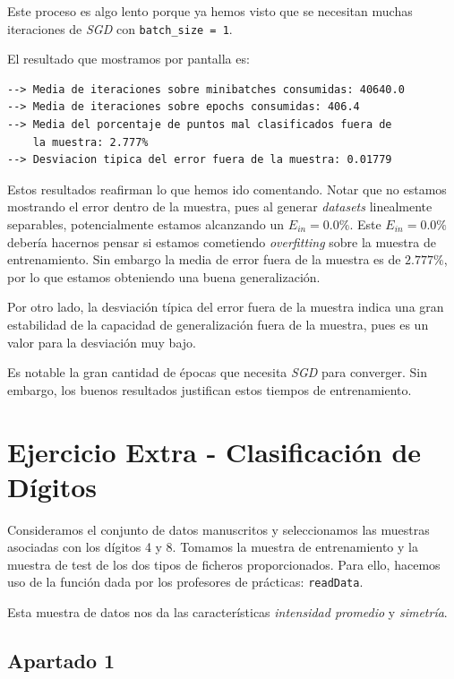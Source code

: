 \documentclass[11pt]{article}
\begin{document}
Este proceso es algo lento porque ya hemos visto que se necesitan muchas iteraciones de \emph{SGD} con \lstinline{batch_size = 1}.

El resultado que mostramos por pantalla es:

\begin{lstlisting}[caption={Resultado de las 100 iteraciones del experimento}, captionpos=b]
--> Media de iteraciones sobre minibatches consumidas: 40640.0
--> Media de iteraciones sobre epochs consumidas: 406.4
--> Media del porcentaje de puntos mal clasificados fuera de
    la muestra: 2.777%
--> Desviacion tipica del error fuera de la muestra: 0.01779
\end{lstlisting}

Estos resultados reafirman lo que hemos ido comentando. Notar que no estamos mostrando el error dentro de la muestra, pues al generar \emph{datasets} linealmente separables, potencialmente estamos alcanzando un $E_{in} = 0.0\%$. Este $E_{in} = 0.0\%$ debería hacernos pensar si estamos cometiendo \emph{overfitting} sobre la muestra de entrenamiento. Sin embargo la media de error fuera de la muestra es de $2.777\%$, por lo que estamos obteniendo una buena generalización.

Por otro lado, la desviación típica del error fuera de la muestra indica una gran estabilidad de la capacidad de generalización fuera de la muestra, pues es un valor para la desviación muy bajo.

Es notable la gran cantidad de épocas que necesita \emph{SGD} para converger. Sin embargo, los buenos resultados justifican estos tiempos de entrenamiento.

\pagebreak

\section{Ejercicio Extra - Clasificación de Dígitos}

Consideramos el conjunto de datos manuscritos y seleccionamos las muestras asociadas con los dígitos 4 y 8. Tomamos la muestra de entrenamiento y la muestra de test de los dos tipos de ficheros proporcionados. Para ello, hacemos uso de la función dada por los profesores de prácticas: \lstinline{readData}.

Esta muestra de datos nos da las características \emph{intensidad promedio} y \emph{simetría}.

\subsection{Apartado 1}
\end{document}

